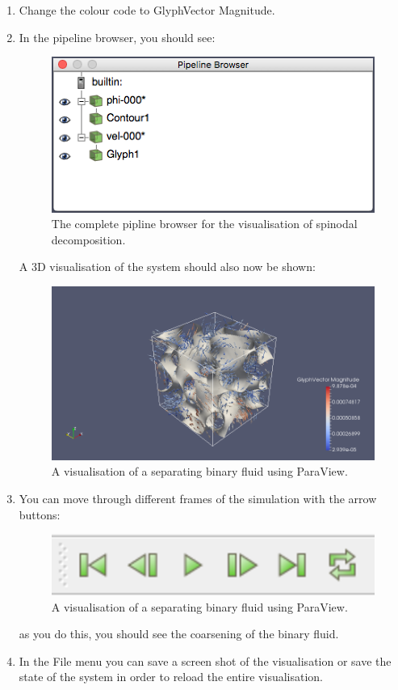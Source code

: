 \documentclass[11pt,twoside,a4paper]{article}
\begin{document}
\begin{enumerate}
\begin{enumerate}
\item Change the colour code to GlyphVector Magnitude.
\item In the pipeline browser, you should see:

\begin{figure}[H]
\begin{center}
\includegraphics[width=0.6\linewidth]{pipeline.png}
  \caption{The complete pipline browser for the visualisation of spinodal decomposition.}
  \label{fig:pipeline}
  \end{center}
\end{figure}

A 3D visualisation of the system should also now be shown:

\begin{figure}[H]
\begin{center}
\includegraphics[width=0.6\linewidth]{system.png}
  \caption{A visualisation of a separating binary fluid using ParaView.}
  \label{fig:sysVisualisation}
  \end{center}
\end{figure}

\item You can move through different frames of the simulation with the arrow buttons:

\begin{figure}[H]
\begin{center}
\includegraphics[width=0.4\linewidth]{arrows.png}
  \caption{A visualisation of a separating binary fluid using ParaView.}
  \label{fig:changeFrame}
  \end{center}
\end{figure}

as you do this, you should see the coarsening of the binary fluid.

\item In the File menu you can save a screen shot of the visualisation or save the state of the system in order to reload the entire visualisation.
\end{enumerate}
\end{enumerate} 
\end{document}
